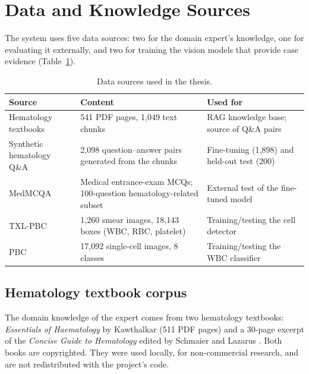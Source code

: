 \section{Data and Knowledge Sources}\label{sec:data}

The system uses five data sources: two for the domain expert's knowledge, one for evaluating it externally, and two for training the vision models that provide case evidence (Table~\ref{tab:datasets}).

\begin{table}[H]
\centering
\caption{Data sources used in the thesis.}
\label{tab:datasets}
\small
\begin{tabularx}{\textwidth}{>{\raggedright\arraybackslash}p{3.4cm} X >{\raggedright\arraybackslash}p{3.8cm}}
\toprule
\textbf{Source} & \textbf{Content} & \textbf{Used for} \\
\midrule
Hematology textbooks \cite{kawthalkar2006,schmaier2012} & 541 PDF pages, 1{,}049 text chunks & RAG knowledge base; source of Q\&A pairs \\
Synthetic hematology Q\&A & 2{,}098 question--answer pairs generated from the chunks & Fine-tuning (1{,}898) and held-out test (200) \\
MedMCQA \cite{pal2022medmcqa} & Medical entrance-exam MCQs; 100-question hematology-related subset & External test of the fine-tuned model \\
TXL-PBC \cite{gan2025txlpbc} & 1{,}260 smear images, 18{,}143 boxes (WBC, RBC, platelet) & Training/testing the cell detector \\
PBC \cite{acevedo2020} & 17{,}092 single-cell images, 8 classes & Training/testing the WBC classifier \\
\bottomrule
\end{tabularx}
\end{table}

\subsection{Hematology textbook corpus}\label{sec:corpus}

The domain knowledge of the expert comes from two hematology textbooks: \emph{Essentials of Haematology} by Kawthalkar \cite{kawthalkar2006} (511 PDF pages) and a 30-page excerpt of the \emph{Concise Guide to Hematology} edited by Schmaier and Lazarus \cite{schmaier2012}. Both books are copyrighted. They were used locally, for non-commercial research, and are not redistributed with the project's code.

